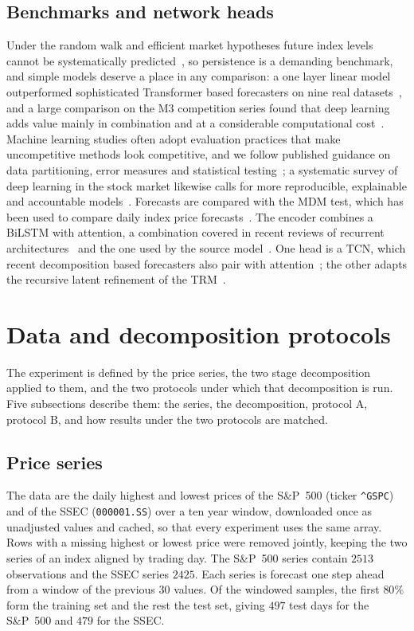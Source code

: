 \documentclass[pdflatex,sn-mathphys-num]{sn-jnl}%
\theoremstyle{thmstyleone}%
\theoremstyle{thmstyletwo}%
\theoremstyle{thmstylethree}%
\begin{document}
\subsection{Benchmarks and network heads}
Under the random walk and efficient market hypotheses future index levels
cannot be systematically predicted~\cite{pernagallo2025}, so persistence is a
demanding benchmark, and simple models deserve a place in any comparison: a one
layer linear model outperformed sophisticated Transformer based forecasters on
nine real datasets~\cite{zeng2023}, and a large comparison on the M3 competition
series found that deep learning adds value mainly in combination and at a
considerable computational cost~\cite{makridakis2022}. Machine learning
studies often adopt evaluation practices that make uncompetitive methods look
competitive, and we follow published guidance on data partitioning, error
measures and statistical testing~\cite{hewamalage2022}; a systematic survey of
deep learning in the stock market likewise calls for more reproducible,
explainable and accountable models~\cite{olorunnimbe2022}. Forecasts are
compared with the MDM test, which has been used to compare daily index price
forecasts~\cite{mdmindex2023}. The encoder combines a BiLSTM with attention, a
combination covered in recent reviews of recurrent
architectures~\cite{rnnreview2024} and the one used by the source
model~\cite{gong2024}. One head is a TCN, which recent decomposition based
forecasters also pair with attention~\cite{psovmdtcn2023,emdleak2024}; the
other adapts the recursive latent refinement of the TRM~\cite{jolicoeur2025}.

\section{Data and decomposition protocols}\label{sec:data}

The experiment is defined by the price series, the two stage decomposition
applied to them, and the two protocols under which that decomposition is run.
Five subsections describe them: the series, the decomposition, protocol A,
protocol B, and how results under the two protocols are matched.

\subsection{Price series}
The data are the daily highest and lowest prices of the S\&P~500 (ticker
\texttt{\textasciicircum GSPC}) and of the SSEC (\texttt{000001.SS}) over a
ten year window, downloaded once as unadjusted values and cached, so that
every experiment uses the same array. Rows with a missing highest or lowest
price were removed jointly, keeping the two series of an index aligned by
trading day. The S\&P~500 series contain $2513$ observations and the SSEC
series $2425$. Each series is forecast one step ahead from a window of the
previous $30$ values. Of the windowed samples, the first $80\%$ form the
training set and the rest the test set, giving $497$ test days for the
S\&P~500 and $479$ for the SSEC.
\end{document}
